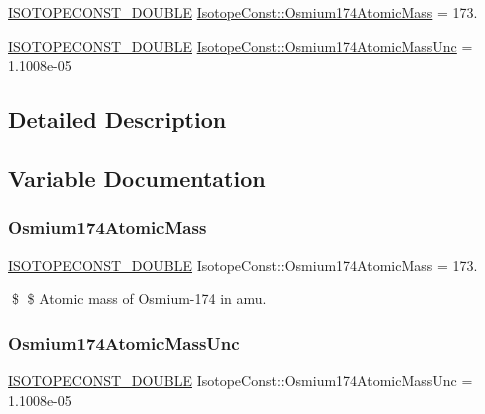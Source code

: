 \begin{DoxyCompactItemize}
\item 
\mbox{\hyperlink{group___isotope_const-_macros_ga8f45a7272ce02c0b4c65c44636ed719a}{I\+S\+O\+T\+O\+P\+E\+C\+O\+N\+S\+T\+\_\+\+D\+O\+U\+B\+LE}} \mbox{\hyperlink{group___isotope_const-_osmium-_os174_gab97cd72dc8575d023cd73e2f8623a82e}{Isotope\+Const\+::\+Osmium174\+Atomic\+Mass}} = 173.
\item 
\mbox{\hyperlink{group___isotope_const-_macros_ga8f45a7272ce02c0b4c65c44636ed719a}{I\+S\+O\+T\+O\+P\+E\+C\+O\+N\+S\+T\+\_\+\+D\+O\+U\+B\+LE}} \mbox{\hyperlink{group___isotope_const-_osmium-_os174_ga657305552319540678caa7e39ebda224}{Isotope\+Const\+::\+Osmium174\+Atomic\+Mass\+Unc}} = 1.\+1008e-\/05
\end{DoxyCompactItemize}


\subsection{Detailed Description}


\subsection{Variable Documentation}
\mbox{\label{group___isotope_const-_osmium-_os174_gab97cd72dc8575d023cd73e2f8623a82e}} 
\subsubsection{\texorpdfstring{Osmium174\+Atomic\+Mass}{Osmium174AtomicMass}}
{\footnotesize\ttfamily \mbox{\hyperlink{group___isotope_const-_macros_ga8f45a7272ce02c0b4c65c44636ed719a}{I\+S\+O\+T\+O\+P\+E\+C\+O\+N\+S\+T\+\_\+\+D\+O\+U\+B\+LE}} Isotope\+Const\+::\+Osmium174\+Atomic\+Mass = 173.}

\$ \$ Atomic mass of Osmium-\/174 in amu. \mbox{\label{group___isotope_const-_osmium-_os174_ga657305552319540678caa7e39ebda224}} 
\subsubsection{\texorpdfstring{Osmium174\+Atomic\+Mass\+Unc}{Osmium174AtomicMassUnc}}
{\footnotesize\ttfamily \mbox{\hyperlink{group___isotope_const-_macros_ga8f45a7272ce02c0b4c65c44636ed719a}{I\+S\+O\+T\+O\+P\+E\+C\+O\+N\+S\+T\+\_\+\+D\+O\+U\+B\+LE}} Isotope\+Const\+::\+Osmium174\+Atomic\+Mass\+Unc = 1.\+1008e-\/05}

